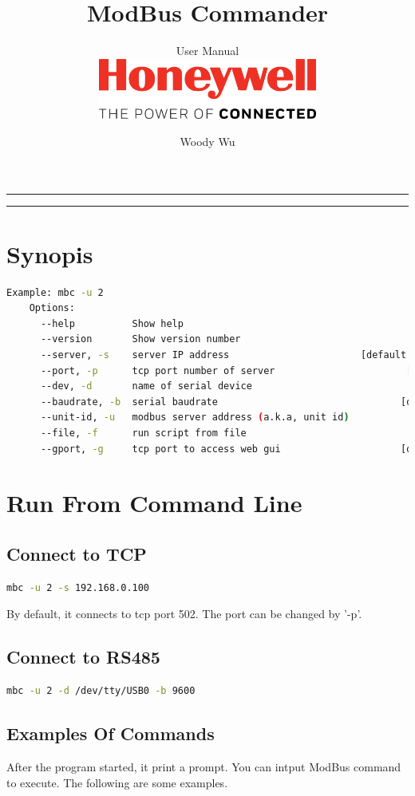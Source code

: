 \documentclass[a4paper,latin]{paper}
\title{ModBus Commander}
\subtitle{User Manual\\
\hfill\includegraphics[height=2cm]{honeywell-logo}
\vspace{-2cm}}
\author{Woody Wu}
\begin{document}
 
\maketitle 
\hrule 
\hrule\bigskip

\section{Synopis} 
\noindent\begin{lstlisting}[language=bash]
    Example: mbc -u 2
    Options:
      --help          Show help                                            [boolean]
      --version       Show version number                                  [boolean]
      --server, -s    server IP address                       [default: "localhost"]
      --port, -p      tcp port number of server                       [default: 502]
      --dev, -d       name of serial device
      --baudrate, -b  serial baudrate                                [default: 9600]
      --unit-id, -u   modbus server address (a.k.a, unit id)              [required]
      --file, -f      run script from file
      --gport, -g     tcp port to access web gui                     [default: 3000]
\end{lstlisting}

\section{Run From Command Line}

\subsection{Connect to TCP}
\noindent\begin{lstlisting}[language=bash]
  mbc -u 2 -s 192.168.0.100
\end{lstlisting}
By default, it connects to tcp port 502. The port can be changed by '-p'.

\subsection{Connect to RS485}
\noindent\begin{lstlisting}[language=bash]
  mbc -u 2 -d /dev/tty/USB0 -b 9600
\end{lstlisting}

\subsection{Examples Of Commands}
After the program started, it print a prompt. You can intput ModBus command to execute.
The following are some examples.
\end{document}
